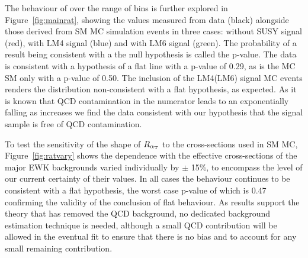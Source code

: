 The behaviour of \RaT over the range of \HT bins is further explored in Figure~\ref{fig:mainrat}, showing the values measured from data (black) alongside those derived from SM MC simulation events in three cases: without SUSY signal (red), with LM4 signal (blue) and with LM6 signal (green). The probability of a result being consistent with a the null hypothesis is called the p-value. The data is consistent with a hypothesis of a flat line with a p-value of 0.29, as is the MC SM only with a p-value of 0.50. The inclusion of the LM4(LM6) signal MC events renders the distribution non-consistent with a flat hypothesis, as expected. As it is known that QCD contamination in the numerator leads to an exponentially falling \RaT as \HT increases we find the data consistent with our hypothesis that the signal sample is free of QCD contamination.

To test the sensitivity of the shape of $R_{\alpha_{\text{T}}}$ to the cross-sections used in SM MC, Figure~\ref{fig:ratvary} shows the \HT dependence with the effective cross-sections of the major EWK backgrounds varied individually by $\pm$ 15\%, to encompass the level of our current certainty of their values. In all cases the behaviour continues to be consistent with a flat hypothesis, the worst case p-value of which is 0.47 confirming the validity of the conclusion of flat behaviour. As results support the theory that \alt has removed the QCD background, no dedicated background estimation technique is needed, although a small QCD contribution will be allowed in the eventual fit to ensure that there is no bias and to account for any small remaining contribution. 


